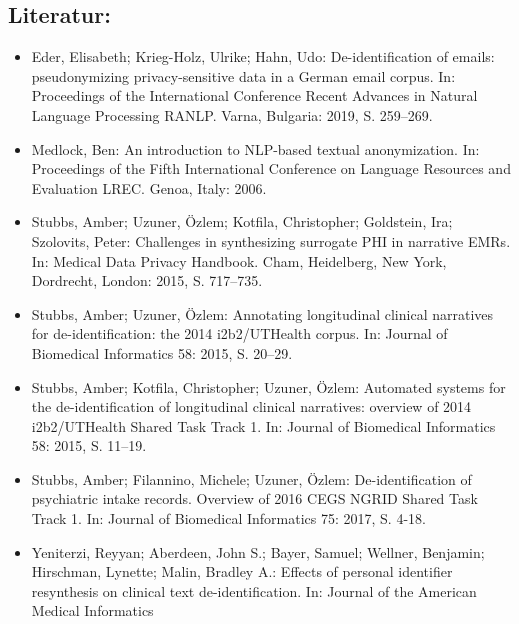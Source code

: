 \documentclass{article}
\begin{document}
        \subsection*{Literatur:}\begin{itemize}\item Eder, Elisabeth; Krieg-Holz, Ulrike; Hahn, Udo: De-identification of emails: pseudonymizing
                              privacy-sensitive data in a German email corpus. In: Proceedings of the International Conference Recent
                              Advances in Natural Language Processing RANLP. Varna, Bulgaria: 2019, S. 259–269.\item Medlock, Ben: An introduction to NLP-based textual
                              anonymization. In: Proceedings of the Fifth International Conference on
                              Language Resources and Evaluation LREC. Genoa, Italy: 2006.\item Stubbs, Amber; Uzuner, Özlem; Kotfila, Christopher; Goldstein, Ira; Szolovits, Peter: Challenges in synthesizing surrogate PHI in narrative
                              EMRs. In: Medical Data Privacy Handbook. Cham, Heidelberg, New York, Dordrecht, London: 2015, S. 717–735.\item Stubbs, Amber; Uzuner, Özlem: Annotating longitudinal clinical narratives for
                              de-identification: the 2014 i2b2/UTHealth corpus. In: Journal of Biomedical Informatics 58: 2015, S. 20–29.\item Stubbs, Amber; Kotfila, Christopher; Uzuner, Özlem: Automated systems for the de-identification of
                              longitudinal clinical narratives: overview of 2014 i2b2/UTHealth
                              Shared Task Track 1. In: Journal of Biomedical Informatics 58: 2015, S. 11–19.\item Stubbs, Amber; Filannino, Michele; Uzuner, Özlem: De-identification of psychiatric intake records.
                              Overview of 2016 CEGS NGRID Shared Task Track 1. In: Journal of Biomedical Informatics 75: 2017, S. 4-18.\item Yeniterzi, Reyyan; Aberdeen, John S.; Bayer, Samuel; Wellner, Benjamin; Hirschman, Lynette; Malin, Bradley A.: Effects of personal identifier resynthesis on clinical
                              text de-identification. In: Journal of the American Medical Informatics

\end{itemize}
\end{document}
